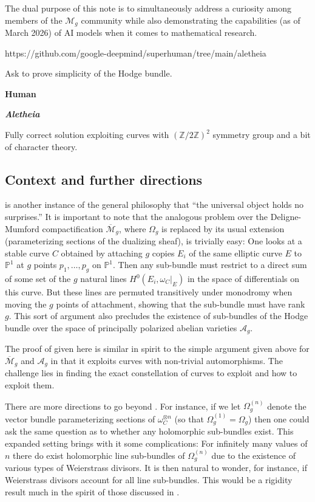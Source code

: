 \documentclass[reqno]{amsart}
\theoremstyle{plain}
\newcommand{\Aletheia}{\emph{Aletheia}}
\renewcommand{\P}{\mathbb{P}}
\newcommand{\Z}{\mathbb{Z}}
\newcommand{\M}{\mathscr{M}}
\newcommand{\human}[1]{%
  \noindent\begin{flushright}
    \begin{minipage}[c]{0.70\textwidth}
      \begin{tcolorbox}[
        enhanced,
        colback=humanbubble, colframe=black!15,
        arc=6pt, sharp corners=southeast, boxrule=0.5pt,
        left=6pt, right=6pt, top=4pt, bottom=4pt, boxsep=0pt
      ]\small #1\end{tcolorbox}
    \end{minipage}%
    \hspace{8pt}
    \begin{minipage}[c]{40pt}
      \footnotesize\sffamily\textbf{Human}
    \end{minipage}
  \end{flushright}
}
\newcommand{\ai}[2]{%
  \noindent\begin{flushleft}
    \begin{minipage}[c]{45pt}
      \footnotesize\sffamily\textbf{#1}
    \end{minipage}%
    \hspace{2pt}
    \begin{minipage}[c]{0.70\textwidth}
      \begin{tcolorbox}[
        enhanced,
        colback=aibubble, colframe=black!15,
        arc=6pt, sharp corners=southwest, boxrule=0.5pt,
        left=6pt, right=6pt, top=4pt, bottom=4pt, boxsep=0pt
      ]\small #2\end{tcolorbox}
    \end{minipage}
  \end{flushleft}
}
\begin{document}
The dual purpose of this note is to simultaneously address a curiosity among
members of the $\mathscr{M}_g$ community while also demonstrating the
capabilities (as of March 2026) of AI models when it comes to mathematical research.

\begin{interactionlog}[]{https://github.com/google-deepmind/superhuman/tree/main/aletheia}

    \human{Ask to prove simplicity of the Hodge bundle.}

    \ai{\Aletheia}{Fully correct solution exploiting curves with $(\mathbb{Z}/2\Z)^2$ symmetry group and a bit of  character theory.}

\end{interactionlog}



\subsection{Context and further directions}

 is another instance of the general 
philosophy that ``the universal object holds no surprises.'' It is important to note that the
analogous problem over the Deligne-Mumford compactification $\overline{\M}_{g}$,
where $\Omega_{g}$ is replaced by its usual extension (parameterizing sections of
the dualizing sheaf), is trivially easy:  One looks at a stable curve $C$ obtained by
attaching $g$ copies $E_{i}$ of the same elliptic curve $E$ to $\P^{1}$ at $g$ points $p_{1}, \dots, p_{g}$ on $\P^{1}$.
Then any sub-bundle must restrict to a direct sum of some set of
the $g$ natural lines $H^{0}(E_{i},\omega_{C}|_{E})$ in the space of differentials on this curve.  But these
lines are permuted transitively under monodromy when moving the $g$ points of
attachment, showing that the sub-bundle must have rank $g$.  This sort of argument also precludes the existence of sub-bundles of
the Hodge bundle over the space of principally polarized abelian varieties $\mathscr{A}_{g}$.  

The proof of  given here is similar in spirit
to the simple argument given above for $\overline{\M}_{g}$ and
$\mathscr{A}_{g}$ in that it exploits curves with non-trivial automorphisms.
The challenge lies in finding the exact constellation of curves to exploit and
how to exploit them. 


There are more directions to go
beyond .  For instance, if we let
$\Omega_{g}^{(n)}$ denote the vector bundle parameterizing sections of
$\omega_{C}^{\otimes n}$  (so that $\Omega_{g}^{(1)} = \Omega_{g}$) then one
could ask the same question as to whether any holomorphic sub-bundles exist.
This expanded setting brings with it some complications: For infinitely many values of
$n$ there do exist holomorphic line sub-bundles of $\Omega_{g}^{(n)}$ due to the existence of various types
of Weierstrass divisors. It is then natural to wonder, for instance, if Weierstrass divisors
account for all line sub-bundles. This would be a rigidity result much in the spirit of those discussed in   \cite{farb2023rigidity}.
\end{document}
